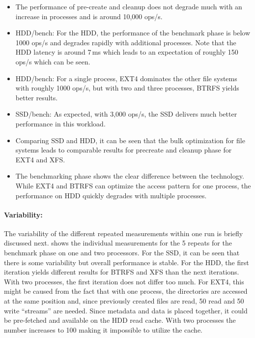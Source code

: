 \documentclass[a4paper,10pt]{article}
\begin{document}
\begin{itemize}
\item The performance of pre-create and cleanup does not degrade much with an increase in processes and is around 10,000 ops/s.
\item HDD/bench: For the HDD, the performance of the benchmark phase is below 1000 ops/s and degrades rapidly with additional processes. 
Note that the HDD latency is around 7\,ms which leads to an expectation of roughly 150 ops/s which can be seen.
\item HDD/bench: For a single process, EXT4 dominates the other file systems with roughly 1000 ops/s, but with two and three processes, BTRFS yields better results.
\item SSD/bench: As expected, with 3,000 ops/s, the SSD delivers much better performance in this workload.
\item Comparing SSD and HDD, it can be seen that the bulk optimization for file systems leads to comparable results for precreate and cleanup phase for EXT4 and XFS.
\item The benchmarking phase shows the clear difference between the technology. 
While EXT4 and BTRFS can optimize the access pattern for one process, the performance on HDD quickly degrades with multiple processes.
\end{itemize}

\paragraph{Variability:}
The variability of the different repeated measurements within one run is briefly discussed next.
 shows the individual measurements for the 5 repeats for the benchmark phase on one and two processors.
For the SSD, it can be seen that there is some variability but overall performance is stable.
For the HDD, the first iteration yields different results for BTRFS and XFS than the next iterations.
With two processes, the first iteration does not differ too much.
For EXT4, this might be caused from the fact that with one process, the directories are accessed at the same position and, since previously created files are read, 50 read and 50 write “streams” are needed.
Since metadata and data is placed together, it could be pre-fetched and available on the HDD read cache. 
With two processes the number increases to 100 making it impossible to utilize the cache.
\end{document}

